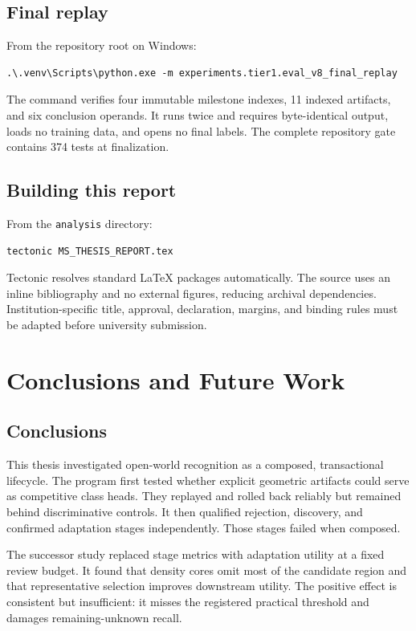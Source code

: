 \documentclass[12pt,oneside]{report}
\begin{document}
\section{Final replay}

From the repository root on Windows:

\begin{verbatim}
.\.venv\Scripts\python.exe -m experiments.tier1.eval_v8_final_replay
\end{verbatim}

The command verifies four immutable milestone indexes, 11 indexed artifacts,
and six conclusion operands. It runs twice and requires byte-identical output,
loads no training data, and opens no final labels. The complete repository gate
contains 374 tests at finalization.

\section{Building this report}

From the \texttt{analysis} directory:

\begin{verbatim}
tectonic MS_THESIS_REPORT.tex
\end{verbatim}

Tectonic resolves standard LaTeX packages automatically. The source uses an
inline bibliography and no external figures, reducing archival dependencies.
Institution-specific title, approval, declaration, margins, and binding rules
must be adapted before university submission.

\chapter{Conclusions and Future Work}

\section{Conclusions}

This thesis investigated open-world recognition as a composed, transactional
lifecycle. The program first tested whether explicit geometric artifacts could
serve as competitive class heads. They replayed and rolled back reliably but
remained behind discriminative controls. It then qualified rejection,
discovery, and confirmed adaptation stages independently. Those stages failed
when composed.

The successor study replaced stage metrics with adaptation utility at a fixed
review budget. It found that density cores omit most of the candidate region
and that representative selection improves downstream utility. The positive
effect is consistent but insufficient: it misses the registered practical
threshold and damages remaining-unknown recall.
\end{document}

